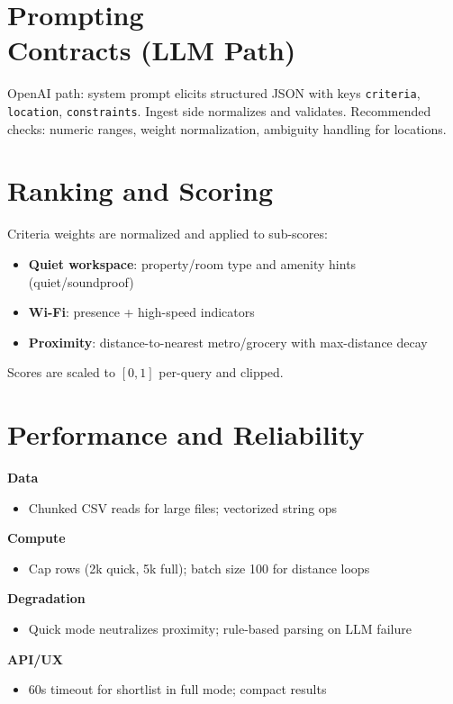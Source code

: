 \documentclass[11pt]{article}
\begin{document}
\section{Prompting \\ Contracts (LLM Path)}
OpenAI path: system prompt elicits structured JSON with keys \texttt{criteria}, \texttt{location}, \texttt{constraints}. Ingest side normalizes and validates. Recommended checks: numeric ranges, weight normalization, ambiguity handling for locations.

\section{Ranking and Scoring}
Criteria weights are normalized and applied to sub-scores:
\begin{itemize}
  \item \textbf{Quiet workspace}: property/room type and amenity hints (quiet/soundproof)
  \item \textbf{Wi-Fi}: presence + high-speed indicators
  \item \textbf{Proximity}: distance-to-nearest metro/grocery with max-distance decay
\end{itemize}
Scores are scaled to $[0, 1]$ per-query and clipped.

\section{Performance and Reliability}
\textbf{Data}
\begin{itemize}
  \item Chunked CSV reads for large files; vectorized string ops
\end{itemize}
\textbf{Compute}
\begin{itemize}
  \item Cap rows (2k quick, 5k full); batch size 100 for distance loops
\end{itemize}
\textbf{Degradation}
\begin{itemize}
  \item Quick mode neutralizes proximity; rule-based parsing on LLM failure
\end{itemize}
\textbf{API/UX}
\begin{itemize}
  \item 60s timeout for shortlist in full mode; compact results
\end{itemize}
\end{document}
